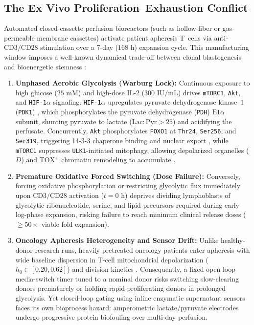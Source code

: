 \documentclass[11pt]{article}
\theoremstyle{plain}
\theoremstyle{remark}
\begin{document}
\subsection{The Ex Vivo Proliferation--Exhaustion Conflict}
Automated closed-cassette perfusion bioreactors (such as hollow-fiber or gas-permeable membrane cassettes) activate patient apheresis T~cells via anti-$\text{CD3}/\text{CD28}$ stimulation over a 7-day ($168\text{ h}$) expansion cycle. This manufacturing window imposes a well-known dynamical trade-off between clonal blastogenesis and bioenergetic stemness \cite{sukumar2013inhibiting,buck2016mitochondrial}:
\begin{enumerate}
  \item \textbf{Unphased Aerobic Glycolysis (Warburg Lock):} Continuous exposure to high glucose ($25\text{ mM}$) and high-dose IL-2 ($300\text{ IU/mL}$) drives \texttt{mTORC1}, \texttt{Akt}, and \texttt{HIF-1$\alpha$} signaling. \texttt{HIF-1$\alpha$} upregulates pyruvate dehydrogenase kinase~1 (\texttt{PDK1}) \cite{kato2007pdk1}, which phosphorylates the pyruvate dehydrogenase (\texttt{PDH}) $\text{E1}\alpha$ subunit, shunting pyruvate to lactate ($\mathrm{Lac:Pyr} > 25$) and acidifying the perfusate. Concurrently, \texttt{Akt} phosphorylates \texttt{FOXO1} at \texttt{Thr24}, \texttt{Ser256}, and \texttt{Ser319}, triggering 14-3-3 chaperone binding and nuclear export \cite{doan2024foxo1,chan2024foxo1}, while \texttt{mTORC1} suppresses \texttt{ULK1}-initiated mitophagy, allowing depolarized organelles ($D$) and $\text{TOX}^+$ chromatin remodeling to accumulate \cite{sukumar2013inhibiting,pauken2016epigenetic}.
  \item \textbf{Premature Oxidative Forced Switching (Dose Failure):} Conversely, forcing oxidative phosphorylation or restricting glycolytic flux immediately upon $\text{CD3}/\text{CD28}$ activation ($t = 0\text{ h}$) deprives dividing lymphoblasts of glycolytic ribonucleotide, serine, and lipid precursors required during early log-phase expansion, risking failure to reach minimum clinical release doses ($\ge 50\times$ viable fold expansion).
  \item \textbf{Oncology Apheresis Heterogeneity and Sensor Drift:} Unlike healthy-donor research runs, heavily pretreated oncology patients enter apheresis with wide baseline dispersion in T-cell mitochondrial depolarization ($h_0 \in [0.20, 0.62]$) and division kinetics \cite{fraietta2018determinants}. Consequently, a fixed open-loop media-switch timer tuned to a nominal donor risks switching slow-clearing donors prematurely or holding rapid-proliferating donors in prolonged glycolysis. Yet closed-loop gating using inline enzymatic supernatant sensors faces its own bioprocess hazard: amperometric lactate/pyruvate electrodes undergo progressive protein biofouling over multi-day perfusion.
\end{enumerate}
\end{document}
